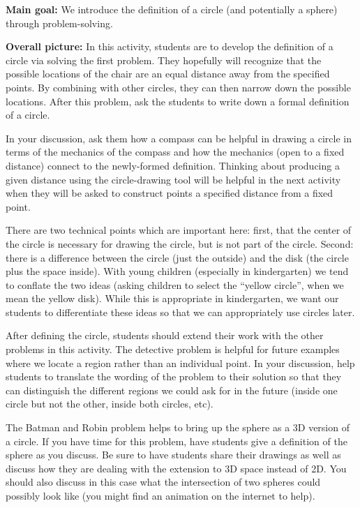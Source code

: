 \documentclass[noauthor,nooutcomes]{ximera}
\begin{document}
\begin{instructorNotes}

{\bf Main goal:} We introduce the definition of a circle (and potentially a sphere) through problem-solving.

{\bf Overall picture:} 
In this activity, students are to develop the definition of a circle via solving the first problem.  They hopefully will recognize that the possible locations of the chair are an equal distance away from the specified points. By combining with other circles, they can then narrow down the possible locations.  After this problem, ask the students to write down a formal definition of a circle.

In your discussion, ask them how a compass can be helpful in drawing a circle in terms of the mechanics of the compass and how the mechanics (open to a fixed distance) connect to the newly-formed definition.  Thinking about producing a given distance using the circle-drawing tool will be helpful in the next activity when they will be asked to construct points a specified distance from a fixed point.

There are two technical points which are important here: first, that the center of the circle is necessary for drawing the circle, but is not part of the circle. Second: there is a difference between the circle (just the outside) and the disk (the circle plus the space inside). With young children (especially in kindergarten) we tend to conflate the two ideas (asking children to select the ``yellow circle'', when we mean the yellow disk). While this is appropriate in kindergarten, we want our students to differentiate these ideas so that we can appropriately use circles later.

After defining the circle, students should extend their work with the other problems in this activity. The detective problem is helpful for future examples where we locate a region rather than an individual point. In your discussion, help students to translate the wording of the problem to their solution so that they can distinguish the different regions we could ask for in the future (inside one circle but not the other, inside both circles, etc).

The Batman and Robin problem helps to bring up the sphere as a 3D version of a circle. If you have time for this problem, have students give a definition of the sphere as you discuss. Be sure to have students share their drawings as well as discuss how they are dealing with the extension to 3D space instead of 2D. You should also discuss in this case what the intersection of two spheres could possibly look like (you might find an animation on the internet to help).


\end{instructorNotes}
\end{document}
